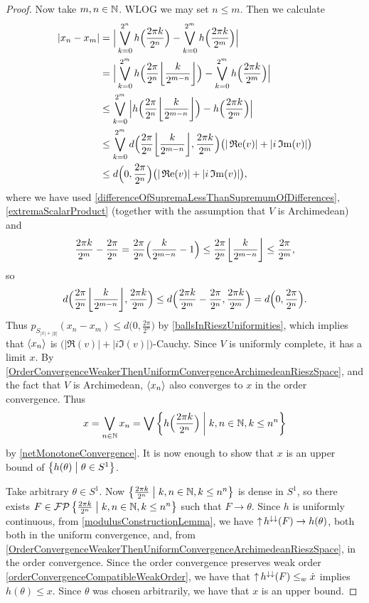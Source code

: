\begin{proof}
Now take $m,n\in \mathbb{N}$. WLOG we may set $n\leq m$. Then we calculate
\begin{align*}
|x_n - x_m| &= \Big|\bigvee_{k=0}^{2^n} h\Big(\frac{2\pi k}{2^n}\Big) - \bigvee_{k=0}^{2^m} h\Big(\frac{2\pi k}{2^m}\Big)\Big| \\
&= \Big|\bigvee_{k=0}^{2^m} h\Big(\frac{2\pi}{2^n}\floor*{\frac{k}{2^{m-n}}}\Big) - \bigvee_{k=0}^{2^m} h\Big(\frac{2\pi k}{2^m}\Big)\Big| \\
&\leq \bigvee_{k=0}^{2^m}\Big| h\Big(\frac{2\pi}{2^n}\floor*{\frac{k}{2^{m-n}}}\Big) - h\Big(\frac{2\pi k}{2^m}\Big)\Big| \\
&\leq \bigvee_{k=0}^{2^m}d\Big(\frac{2\pi}{2^n}\floor*{\frac{k}{2^{m-n}}}, \frac{2\pi k}{2^m}\Big)\big(|\Re(v)| + |i\Im(v)|\big) \\
&\leq d\Big(0,\frac{2\pi}{2^n}\Big)\big(|\Re(v)| + |i\Im(v)|\big),
\end{align*}
where we have used \ref{differenceOfSupremaLessThanSupremumOfDifferences}, \ref{extremaScalarProduct} (together with the assumption that $V$ is Archimedean) and
\[ \frac{2\pi k}{2^m} - \frac{2\pi}{2^n} = \frac{2\pi}{2^n}\Big(\frac{k}{2^{m-n}} - 1\Big) \leq \frac{2\pi}{2^n}\floor*{\frac{k}{2^{m-n}}} \leq \frac{2\pi}{2^m}, \]
so
\[ d\Big(\frac{2\pi}{2^n}\floor*{\frac{k}{2^{m-n}}}, \frac{2\pi k}{2^m}\Big) \leq d\Big(\frac{2\pi k}{2^m} - \frac{2\pi}{2^n}, \frac{2\pi k}{2^m}\Big) = d\Big(0, \frac{2\pi}{2^n}\Big). \]
Thus $p_{S_{|x|+|y|}}(x_n - x_m) \leq d\Big(0,\frac{2\pi}{2^n}\Big)$ by \ref{ballsInRieszUniformities}, which implies that $\left\langle x_n \right\rangle$ is $\big(|\Re(v)| + |i\Im(v)|\big)$-Cauchy.
Since $V$ is uniformly complete, it has a limit $x$. By \ref{OrderConvergenceWeakerThenUniformConvergenceArchimedeanRieszSpace}, and the fact that $V$ is Archimedean, $\left\langle x_n \right\rangle$ also converges to $x$ in the order convergence. Thus
\[ x = \bigvee_{n\in \N}x_n = \bigvee \setbuilder{h\Big(\frac{2\pi k}{2^n}\Big)}{k,n\in\N, k\leq n^n} \]
by \ref{netMonotoneConvergence}. It is now enough to show that $x$ is an upper bound of $\setbuilder{h(\theta)}{\theta\in S^1}$.

Take arbitrary $\theta\in S^1$. Now $\setbuilder{\frac{2\pi k}{2^n}}{k,n\in\N, k\leq n^n}$ is dense in $S^1$, so there exists $F\in \powerfilters\setbuilder{\frac{2\pi k}{2^n}}{k,n\in\N, k\leq n^n}$ such that $F\to \theta$. Since $h$ is uniformly continuous, from \ref{modulusConstructionLemma},  we have $\operatorname{\uparrow} h^{\downarrow\downarrow}(F) \to h(\theta)$, both both in the uniform convergence, and, from \ref{OrderConvergenceWeakerThenUniformConvergenceArchimedeanRieszSpace}, in the order convergence. Since the order convergence preserves weak order \ref{orderConvergenceCompatibleWeakOrder}, we have that $\operatorname{\uparrow} h^{\downarrow\downarrow}(F) \leq_w \dot{x}$ implies $h(\theta) \leq x$. Since $\theta$ was chosen arbitrarily, we have that $x$ is an upper bound.
\end{proof}

